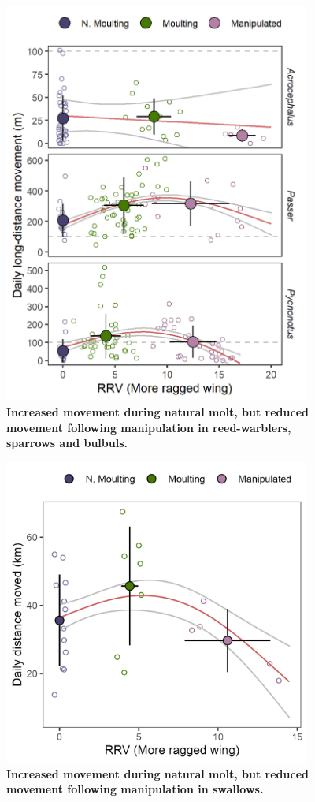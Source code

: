 \begin{figure}[!h]
    \centering
    \includegraphics[width=0.9\textwidth]{figures/holeybirds/fig_01.png}
    \caption{
        \textbf{Increased movement during natural molt, but reduced movement following manipulation in reed-warblers, sparrows and bulbuls.}
    }\label{moult_fig_01}
\end{figure}

\begin{figure}[!h]
    \centering
    \includegraphics[width=0.9\textwidth]{figures/holeybirds/fig_02.png}
    \caption{
        \textbf{Increased movement during natural molt, but reduced movement following manipulation in swallows.}
    }\label{moult_fig_02}
    \end{figure}

